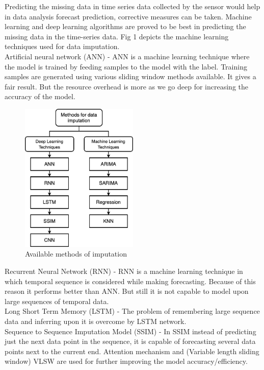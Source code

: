 Predicting the missing data in time series data collected by the sensor would help in data analysis forecast prediction, corrective measures can be taken.\cite{24}
Machine learning and deep learning algorithms are proved to be best in predicting the missing data in the time-series data. Fig 1 depicts the machine learning techniques used for data imputation.
\\

Artificial neural network (ANN) - 
ANN is a machine learning technique where the model is trained by feeding samples to the model with the label. Training samples are generated using various sliding window methods available. It gives a fair result. But the resource overhead is more as we go deep for increasing the accuracy of the model.\cite{25}

\begin{figure}[ht]
	\centering
	\includegraphics[width=0.5\textwidth]{images/algos.png}
	\caption{Available methods of imputation}
	\label{fig:algos}
\end{figure}

Recurrent Neural Network (RNN) - 
RNN is a machine learning technique in which temporal sequence is considered while making forecasting. Because of this reason it performs better than ANN. But still it is not capable to model upon large sequences of temporal data.\cite{26}
\\

Long Short Term Memory (LSTM) - 
The problem of remembering large sequence data and inferring upon it is overcome by LSTM network.\cite{27}
\\

Sequence to Sequence Imputation Model (SSIM) - 
In SSIM \cite{37} instead of predicting just the next data point in the sequence, it is capable of forecasting several data points next to the current end. Attention mechanism and (Variable length sliding window) VLSW are used for further improving the model accuracy/efficiency.\cite{28}
\\

